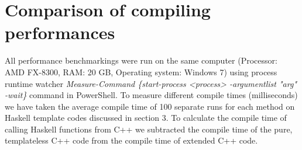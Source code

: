 \documentclass{article}
\begin{document}
\begin{comment}
\begin{lstlisting}[language=]

\end{lstlisting}
\centerline{\Bigg\Downarrow} \\
\begin{lstlisting}[language=]

\end{lstlisting}

\begin{lstlisting}[language=]

\end{lstlisting}
\centerline{\Bigg\Downarrow} \\
\begin{lstlisting}[language=]

\end{lstlisting}
\end{comment}
\section{Comparison of compiling performances}
All performance benchmarkings were run on the same computer (Processor: AMD FX-8300, RAM: 20 GB, Operating system: Windows 7) using process runtime watcher \textit{Measure-Command \{start-process <process> -argumentlist "arg" -wait\}} command in PowerShell.
To measure different compile times (milliseconds) we have taken the average compile time of 100 separate runs for each method on Haskell template codes discussed in section 3.
To calculate the compile time of calling Haskell functions from C++ we subtracted the compile time of the pure, templateless C++ code from the compile time of extended C++ code.
\begin{center}
\end{center}
\end{document}
